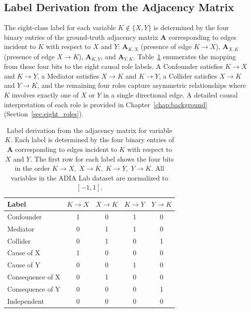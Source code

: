 \subsection{Label Derivation from the Adjacency Matrix}
\label{sec:label_derivation}

The eight-class label for each variable $K \notin \{X, Y\}$ is determined by the four binary entries of the ground-truth adjacency matrix $\mathbf{A}$ corresponding to edges incident to $K$ with respect to $X$ and $Y$: $\mathbf{A}_{K,X}$ (presence of edge $K \to X$), $\mathbf{A}_{X,K}$ (presence of edge $X \to K$), $\mathbf{A}_{K,Y}$, and $\mathbf{A}_{Y,K}$. Table~\ref{tab:label_rules_eval} enumerates the mapping from these four bits to the eight causal role labels. A Confounder satisfies $K \to X$ and $K \to Y$, a Mediator satisfies $X \to K$ and $K \to Y$, a Collider satisfies $X \to K$ and $Y \to K$, and the remaining four roles capture asymmetric relationships where $K$ involves exactly one of $X$ or $Y$ in a single directional edge. A detailed causal interpretation of each role is provided in Chapter~\ref{chap:background} (Section~\ref{sec:eight_roles}).

\begin{table}[ht]
	\centering
	\caption{Label derivation from the adjacency matrix for variable $K$. Each label is determined by the four binary entries of $\mathbf{A}$ corresponding to edges incident to $K$ with respect to $X$ and $Y$. The first row for each label shows the four bits in the order $K\to X,\; X\to K,\; K\to Y,\; Y\to K$. All variables in the ADIA Lab dataset are normalized to $[-1,1]$.}
	\label{tab:label_rules_eval}
	\begin{tabular}{lcccc}
		\toprule
		\textbf{Label} & $K\to X$ & $X\to K$ & $K\to Y$ & $Y\to K$ \\
		\midrule
		Confounder       & 1 & 0 & 1 & 0 \\
		Mediator         & 0 & 1 & 1 & 0 \\
		Collider         & 0 & 1 & 0 & 1 \\
		Cause of X       & 1 & 0 & 0 & 0 \\
		Cause of Y       & 0 & 0 & 1 & 0 \\
		Consequence of X & 0 & 1 & 0 & 0 \\
		Consequence of Y & 0 & 0 & 0 & 1 \\
		Independent      & 0 & 0 & 0 & 0 \\
		\bottomrule
	\end{tabular}
\end{table}

